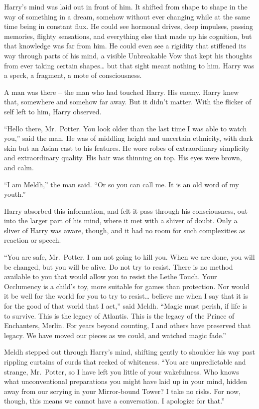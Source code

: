Harry's mind was laid out in front of him. It shifted from shape to
shape in the way of something in a dream, somehow without ever changing
while at the same time being in constant flux. He could see hormonal
drives, deep impulses, passing memories, flighty sensations, and
everything else that made up his cognition, but that knowledge was far
from him. He could even see a rigidity that stiffened its way through
parts of his mind, a visible Unbreakable Vow that kept his thoughts from
ever taking certain shapes\ldots{} but that sight meant nothing to him.
Harry was a speck, a fragment, a mote of consciousness.

A man was there -- the man who had touched Harry. His enemy. Harry knew
that, somewhere and somehow far away. But it didn't matter. With the
flicker of self left to him, Harry observed.

``Hello there, Mr.~Potter. You look older than the last time I was able
to watch you,'' said the man. He was of middling height and uncertain
ethnicity, with dark skin but an Asian cast to his features. He wore
robes of extraordinary simplicity and extraordinary quality. His hair
was thinning on top. His eyes were brown, and calm.

``I am Meldh,'' the man said. ``Or so you can call me. It is an old word
of my youth.''

Harry absorbed this information, and felt it pass through his
consciousness, out into the larger part of his mind, where it met with a
shiver of doubt. Only a sliver of Harry was aware, though, and it had no
room for such complexities as reaction or speech.

``You are safe, Mr.~Potter. I am not going to kill you. When we are
done, you will be changed, but you will be alive. Do not try to resist.
There is no method available to you that would allow you to resist the
Lethe Touch. Your Occlumency is a child's toy, more suitable for games
than protection. Nor would it be well for the world for you to try to
resist\ldots{} believe me when I say that it is for the good of that
world that I act,'' said Meldh. ``Magic must perish, if life is to
survive. This is the legacy of Atlantis. This is the legacy of the
Prince of Enchanters, Merlin. For years beyond counting, I and others
have preserved that legacy. We have moved our pieces as we could, and
watched magic fade.''

Meldh stepped out through Harry's mind, shifting gently to shoulder his
way past rippling curtains of curds that reeked of whiteness. ``You are
unpredictable and strange, Mr.~Potter, so I have left you little of your
wakefulness. Who knows what unconventional preparations you might have
laid up in your mind, hidden away from our scrying in your Mirror-bound
Tower? I take no risks. For now, though, this means we cannot have a
conversation. I apologize for that.''

